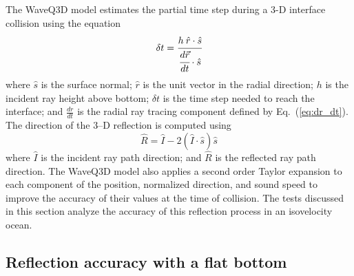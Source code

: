\documentclass{ws-jca}
\begin{document}
The WaveQ3D model estimates the partial time step during a 3-D interface
collision using the equation
\begin{equation}
	\delta t = \cfrac{h \: \hat{r} \cdot \hat{s}}{\cfrac{d\vec{r}}{dt} \cdot \hat{s}}
	\label{eq:reflection_time_bottom}
\end{equation}
where
\(\hat{s}\) is the surface normal;
\(\hat{r}\) is the unit vector in the radial direction;
$h$ is the incident ray height above bottom;
\(\delta t\) is the time step needed to reach the interface; and
\(\frac{dr}{dt}\) is the radial ray tracing component defined by Eq.~(\ref{eq:dr_dt}).
The direction of the 3--D reflection is computed using
\begin{equation}
	\hat{R} =  \hat{I} - 2 ( \hat{I} \cdot \hat{s} ) \hat{s}
	\label{eq:reflect_direction}
\end{equation}
where
\(\hat{I}\) is the incident ray path direction; and
\(\hat{R}\) is the reflected ray path direction.
The WaveQ3D model also applies a second order Taylor expansion to each
component of the position, normalized direction, and sound speed to improve
the accuracy of their values at the time of collision. The tests discussed
in this section analyze the accuracy of this reflection process in an
isovelocity ocean.

\subsection{Reflection accuracy with a flat bottom}
\end{document}
